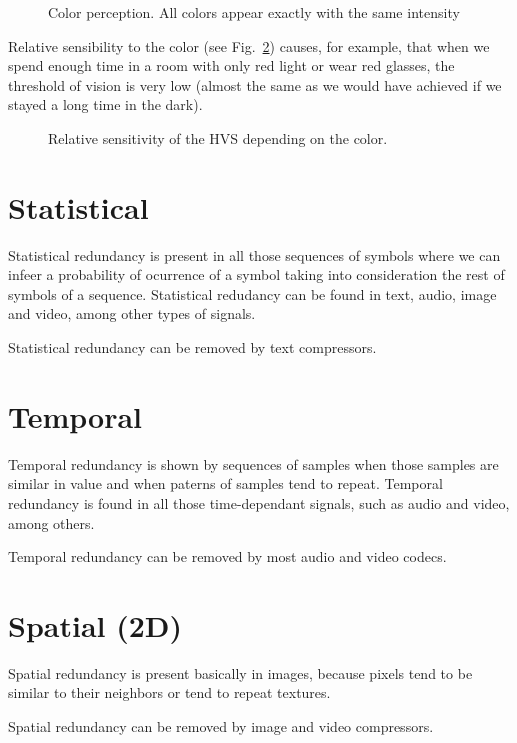 \begin{figure}
  \caption{Color perception. All colors appear exactly with the same intensity} %
  \label{fig:color_perception}
\end{figure}

Relative sensibility to the color (see Fig.~\ref{fig:color_relative_sensibility}) causes, for example, that when we spend enough time in a room with only red light or wear red glasses, the threshold of vision is very low (almost the same as we would have achieved if we stayed a long time in the dark).

\begin{figure}
  \caption{Relative sensitivity of the HVS depending on the color.} %
  \label{fig:color_relative_sensibility}
\end{figure}

\section{Statistical}
Statistical redundancy is present in all those sequences of symbols
where we can infeer a probability of ocurrence of a symbol
taking into consideration the rest of symbols of a
sequence. Statistical redudancy can be found in text, audio, image and
video, among other types of signals.

Statistical redundancy can be removed by text compressors.

\section{Temporal}
Temporal redundancy is shown by sequences of samples when those
samples are similar in value and when paterns of samples tend to
repeat. Temporal redundancy is found in all those time-dependant
signals, such as audio and video, among others.

Temporal redundancy can be removed by most audio and video codecs.

\section{Spatial (2D)}
Spatial redundancy is present basically in images, because pixels tend
to be similar to their neighbors or tend to repeat textures.

Spatial redundancy can be removed by image and video compressors.

